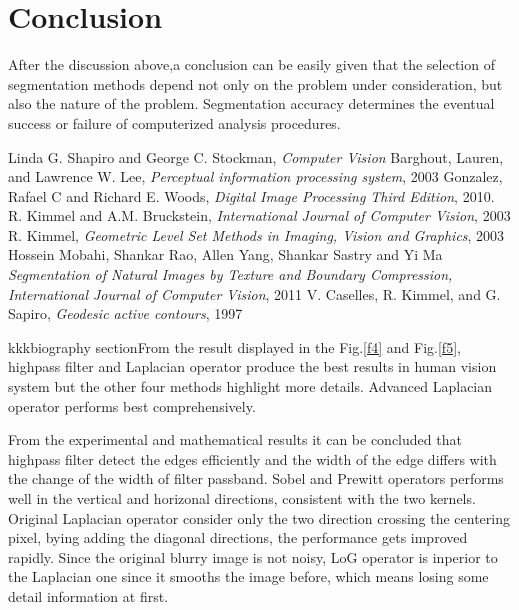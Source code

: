 \documentclass[journal]{IEEEtran}
\begin{document}
\section{Conclusion}
After the discussion above,a conclusion can be easily given that the selection of segmentation methods depend not only on the problem under consideration, but also the nature of the problem. Segmentation accuracy determines the eventual success or failure of computerized analysis procedures.








\begin{thebibliography}{1}
Linda G. Shapiro and George C. Stockman, \emph{Computer Vision}
Barghout, Lauren, and Lawrence W. Lee, \emph{Perceptual information processing system}, 2003
Gonzalez, Rafael C and Richard E. Woods, \emph{Digital Image Processing Third Edition}, 2010.
R. Kimmel and A.M. Bruckstein, \emph{International Journal of Computer Vision}, 2003
R. Kimmel, \emph{Geometric Level Set Methods in Imaging, Vision and Graphics}, 2003
Hossein Mobahi, Shankar Rao, Allen Yang, Shankar Sastry and Yi Ma \emph{Segmentation of Natural Images by Texture and Boundary Compression, International Journal of Computer Vision}, 2011
V. Caselles, R. Kimmel, and G. Sapiro, \emph{Geodesic active contours}, 1997

\end{thebibliography}





{\color{white}
kkkbiography sectionFrom the result displayed in the Fig.\ref{f4} and Fig.\ref{f5}, highpass filter and Laplacian operator produce the best results in human vision system but the other four methods highlight more details. Advanced Laplacian operator performs best comprehensively.

From the experimental and mathematical results it can be concluded that highpass filter detect the edges efficiently and the width of the edge differs with the change of the width of filter passband. Sobel and Prewitt operators performs well in the vertical and horizonal directions, consistent with the two kernels. Original Laplacian operator consider only the two direction crossing the centering pixel, bying adding the diagonal directions, the performance gets improved rapidly. Since the original blurry image is not noisy, LoG operator is inperior to the Laplacian one since it smooths the image before, which means losing some detail information at first.}





\end{document}
